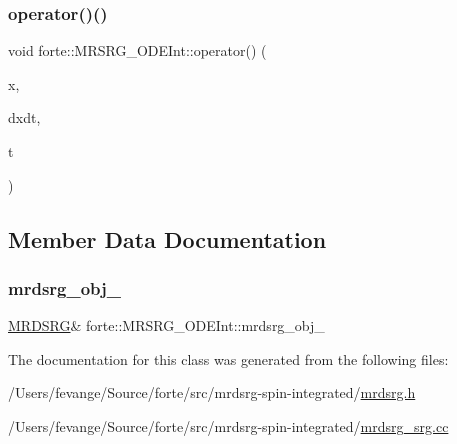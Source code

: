 \subsubsection{\texorpdfstring{operator()()}{operator()()}}
{\footnotesize\ttfamily void forte\+::\+M\+R\+S\+R\+G\+\_\+\+O\+D\+E\+Int\+::operator() (\begin{DoxyParamCaption}\item[{const \mbox{\hyperlink{namespaceforte_ad8fa2d4b40cee55f959c09c9be68a63e}{odeint\+\_\+state\+\_\+type}} \&}]{x,  }\item[{\mbox{\hyperlink{namespaceforte_ad8fa2d4b40cee55f959c09c9be68a63e}{odeint\+\_\+state\+\_\+type}} \&}]{dxdt,  }\item[{const double}]{t }\end{DoxyParamCaption})}



\subsection{Member Data Documentation}
\mbox{\label{classforte_1_1_m_r_s_r_g___o_d_e_int_a0c09fbabc7b1e4dbf90c102517521129}} 
\subsubsection{\texorpdfstring{mrdsrg\+\_\+obj\+\_\+}{mrdsrg\_obj\_}}
{\footnotesize\ttfamily \mbox{\hyperlink{classforte_1_1_m_r_d_s_r_g}{M\+R\+D\+S\+RG}}\& forte\+::\+M\+R\+S\+R\+G\+\_\+\+O\+D\+E\+Int\+::mrdsrg\+\_\+obj\+\_\+\hspace{0.3cm}{\ttfamily [protected]}}



The documentation for this class was generated from the following files\+:\begin{DoxyCompactItemize}
\item 
/\+Users/fevange/\+Source/forte/src/mrdsrg-\/spin-\/integrated/\mbox{\hyperlink{mrdsrg_8h}{mrdsrg.\+h}}\item 
/\+Users/fevange/\+Source/forte/src/mrdsrg-\/spin-\/integrated/\mbox{\hyperlink{mrdsrg__srg_8cc}{mrdsrg\+\_\+srg.\+cc}}\end{DoxyCompactItemize}
